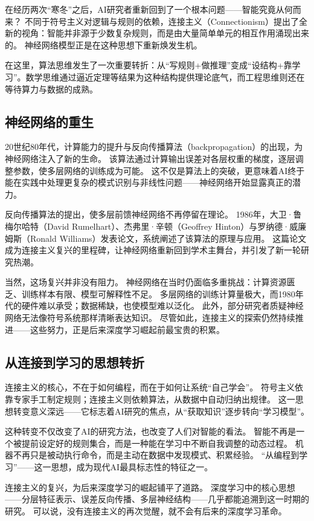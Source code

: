 在经历两次“寒冬”之后，AI研究者重新回到了一个根本问题——智能究竟从何而来？  
不同于符号主义对逻辑与规则的依赖，连接主义（Connectionism）提出了全新的视角：智能并非源于少数复杂规则，而是由大量简单单元的相互作用涌现出来的。  
神经网络模型正是在这种思想下重新焕发生机。

在这里，算法思维发生了一次重要转折：从“写规则+做推理”变成“设结构+靠学习”。数学思维通过逼近定理等结果为这种结构提供理论底气，而工程思维则还在等待算力与数据的成熟。

\subsection{神经网络的重生}

20世纪80年代，计算能力的提升与反向传播算法（backpropagation）的出现，为神经网络注入了新的生命。  
该算法通过计算输出误差对各层权重的梯度，逐层调整参数，使多层网络的训练成为可能。  
这不仅是算法上的突破，更意味着AI终于能在实践中处理更复杂的模式识别与非线性问题——神经网络开始显露真正的潜力。

反向传播算法的提出，使多层前馈神经网络不再停留在理论。  
1986年，大卫·鲁梅尔哈特（David Rumelhart）、杰弗里·辛顿（Geoffrey Hinton）与罗纳德·威廉姆斯（Ronald Williams）发表论文，系统阐述了该算法的原理与应用。  
这篇论文成为连接主义复兴的里程碑，让神经网络重新回到学术主舞台，并引发了新一轮研究热潮。

当然，这场复兴并非没有阻力。  
神经网络在当时仍面临多重挑战：计算资源匮乏、训练样本有限、模型可解释性不足。  
多层网络的训练计算量极大，而1980年代的硬件难以承受；数据稀缺，也使模型难以泛化。  
此外，部分研究者质疑神经网络无法像符号系统那样清晰表达知识。  
尽管如此，连接主义的探索仍然持续推进——这些努力，正是后来深度学习崛起前最宝贵的积累。

\subsection{从连接到学习的思想转折}

连接主义的核心，不在于如何编程，而在于如何让系统“自己学会”。  
符号主义依靠专家手工制定规则；连接主义则依赖算法，从数据中自动归纳出规律。  
这一思想转变意义深远——它标志着AI研究的焦点，从“获取知识”逐步转向“学习模型”。

这种转变不仅改变了AI的研究方法，也改变了人们对智能的看法。  
智能不再是一个被提前设定好的规则集合，而是一种能在学习中不断自我调整的动态过程。  
机器不再只是被动执行命令，而是主动在数据中发现模式、积累经验。  
“从编程到学习”——这一思想，成为现代AI最具标志性的特征之一。

连接主义的复兴，为后来深度学习的崛起铺平了道路。  
深度学习中的核心思想——分层特征表示、误差反向传播、多层神经结构——几乎都能追溯到这一时期的研究。  
可以说，没有连接主义的再次觉醒，就不会有后来的深度学习革命。

